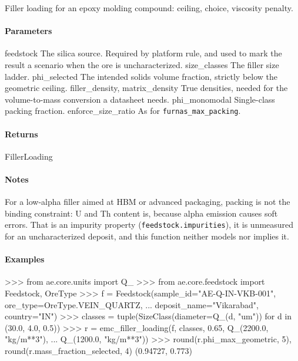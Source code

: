 \documentclass[10pt,a4paper,twoside]{report}
\begin{document}
Filler loading for an epoxy molding compound: ceiling, choice, viscosity penalty.

\paragraph*{Parameters}

feedstock The silica source. Required by platform rule, and used to mark the result a scenario when the ore is uncharacterized. size\_classes The filler size ladder. phi\_selected The intended solids volume fraction, strictly below the geometric ceiling. filler\_density, matrix\_density True densities, needed for the volume-to-mass conversion a datasheet needs. phi\_monomodal Single-class packing fraction. enforce\_size\_ratio As for \texttt{furnas\_max\_packing}.

\paragraph*{Returns}

FillerLoading

\paragraph*{Notes}

For a low-alpha filler aimed at HBM or advanced packaging, packing is not the binding constraint: U and Th content is, because alpha emission causes soft errors. That is an impurity property (\texttt{feedstock.impurities}), it is unmeasured for an uncharacterized deposit, and this function neither models nor implies it.

\paragraph*{Examples}

\begin{doctestblock}
>>> from ae.core.units import Q_
>>> from ae.core.feedstock import Feedstock, OreType
>>> f = Feedstock(sample_id="AE-Q-IN-VKB-001", ore_type=OreType.VEIN_QUARTZ,
...               deposit_name="Vikarabad", country="IN")
>>> classes = tuple(SizeClass(diameter=Q_(d, "um")) for d in (30.0, 4.0, 0.5))
>>> r = emc_filler_loading(f, classes, 0.65, Q_(2200.0, "kg/m**3"),
...                        Q_(1200.0, "kg/m**3"))
>>> round(r.phi_max_geometric, 5), round(r.mass_fraction_selected, 4)
(0.94727, 0.773)
\end{doctestblock}
\end{document}
